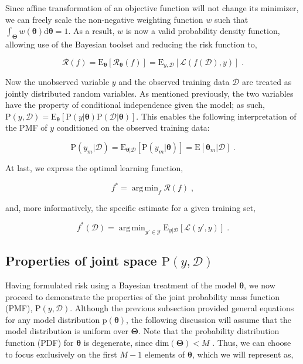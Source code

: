 \documentclass[12pt]{article}
\DeclareMathOperator*{\argmin}{arg\,min}
\begin{document}
Since affine transformation of an objective function will not change its minimizer, we can freely scale the non-negative weighting function $w$ such that $\int_{\bm{\Theta}} w(\bm{\theta}) \mathrm{d}\bm{\theta} = 1$. As a result, $w$ is now a valid probability density function, allowing use of the Bayesian toolset and reducing the risk function to,   

\begin{equation}
\mathcal{R}(f) = \text{E}_{\bm{\theta}}\left[  \mathcal{R}_{\bm{\theta}}(f) \right] = \text{E}_{y,\mathcal{D}}\left[ \mathcal{L}(f(\mathcal{D}),y) \right] \;.
\end{equation}

Now the unobserved variable $y$ and the observed training data $\mathcal{D}$ are treated as jointly distributed random variables. As mentioned previously, the two variables have the property of conditional independence given the model; as such, $\text{P}(y,\mathcal{D}) = \text{E}_{\bm{\theta}} \left[ \text{P}(y | \bm{\theta}) \text{P}(\mathcal{D} | \bm{\theta}) \right]$. This enables the following interpretation of the PMF of $y$ conditioned on the observed training data:

\begin{equation}
\text{P}(y_m|\mathcal{D}) = \text{E}_{\bm{\theta} | \mathcal{D}} \left[ \text{P}(y_m|\bm{\theta}) \right] = \text{E}\left[ \bm{\theta}_m | \mathcal{D} \right] \;.
\end{equation}


At last, we express the optimal learning function,

\begin{equation}
f^* = \argmin_{f} \mathcal{R}(f) \;,
\end{equation}

and, more informatively, the specific estimate for a given training set, 

\begin{equation}
f^*(\mathcal{D}) = \argmin_{y' \in \mathcal{Y}} \text{E}_{y|\mathcal{D}}\left[ \mathcal{L}(y',y) \right] \;.
\end{equation}



\subsection{Properties of joint space $\text{P}(y,\mathcal{D})$}

Having formulated risk using a Bayesian treatment of the model $\bm{\theta}$, we now proceed to demonstrate the properties of the joint probability mass function (PMF), $\text{P}(y,\mathcal{D})$. Although the previous subsection provided general equations for any model distribution $\text{p}(\bm{\theta})$, the following discussion will assume that the model distribution is uniform over $\bm{\Theta}$. Note that the probability distribution function (PDF) for $\bm{\theta}$ is degenerate, since $\text{dim}(\bm{\Theta}) < M$ . Thus, we can choose to focus exclusively on the first $M-1$ elements of $\bm{\theta}$, which we will represent as,
\end{document}
